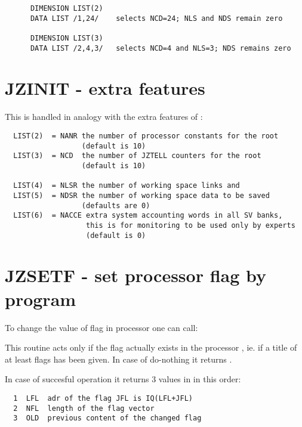 \begin{verbatim}
      DIMENSION LIST(2)
      DATA LIST /1,24/    selects NCD=24; NLS and NDS remain zero

      DIMENSION LIST(3)
      DATA LIST /2,4,3/   selects NCD=4 and NLS=3; NDS remains zero
\end{verbatim} 

\section{JZINIT - extra features}
\label{sec:JZextraJZINIT}

This is handled in analogy with the extra features of :
\begin{verbatim}
  LIST(2)  = NANR the number of processor constants for the root
                  (default is 10)
  LIST(3)  = NCD  the number of JZTELL counters for the root
                  (default is 10)

  LIST(4)  = NLSR the number of working space links and
  LIST(5)  = NDSR the number of working space data to be saved
                  (defaults are 0)
  LIST(6)  = NACCE extra system accounting words in all SV banks,
                   this is for monitoring to be used only by experts
                   (default is 0)
\end{verbatim} 

\newpage
{}
\section{JZSETF - set processor flag by program}

To change the value of flag  in processor  one can call:


This routine acts only if the flag  actually exists
in the processor ,
ie. if a title  of at least  flags has been given.
In case of do-nothing it returns .

In case of succesful operation it returns 3 values in
 in this order:

\begin{verbatim}
  1  LFL  adr of the flag JFL is IQ(LFL+JFL)
  2  NFL  length of the flag vector
  3  OLD  previous content of the changed flag
\end{verbatim} 

